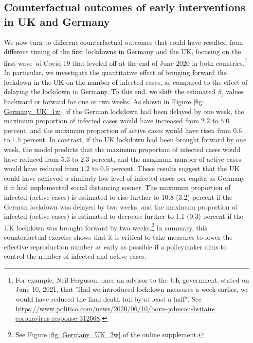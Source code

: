 \documentclass[12pt]{article}
\begin{document}
\subsection{Counterfactual outcomes of early interventions in UK and Germany}

We now turn to different counterfactual outcomes that could have resulted from
different timing of the first lockdowns in Germany and the UK, focusing on the
first wave\ of Covid-19 that leveled off at the end of June 2020 in both
countries.\footnote{For example, Neil Ferguson, once an advisor to the UK
government, stated on June 10, 2021, that "Had we introduced lockdown measures
a week earlier, we would have reduced the final death toll by at least a
half". See
\url{https://www.politico.com/news/2020/06/10/boris-johnson-britain-coronavirus-response-312668}.}
In particular, we investigate the quantitative effect of bringing forward the
lockdown in the UK on the number of infected cases, as compared to the effect
of delaying the lockdown in Germany. To this end, we shift the estimated
$\beta_{t}$ values backward or forward for one or two weeks. As shown in
Figure \ref{fig: Germany_UK_1w}, if the German lockdown had been delayed by
one week, the maximum proportion of infected cases would have increased from
$2.2$ to $5.0$ percent, and the maximum proportion of active cases would have
risen from $0.6$ to $1.5$ percent. In contrast, if the UK lockdown had been
brought forward by one week, the model predicts that the maximum proportion of
infected cases would have reduced from $5.3$ to $2.3$ percent, and the maximum
number of active cases would have reduced from $1.2$ to $0.5$ percent. These
results suggest that the UK could have achieved a similarly low level of
infected cases per capita as Germany if it had implemented social distancing
sooner. The maximum proportion of infected (active cases) is estimated to rise
further to $10.8$ ($3.2$) percent if the German lockdown was delayed by two
weeks, and the maximum proportion of infected (active cases) is estimated to
decrease further to $1.1$ ($0.3$) percent if the UK lockdown was brought
forward by two weeks.\footnote{See Figure \ref{fig: Germany_UK_2w} of the
online supplement.} In summary, this counterfactual exercise shows that it is
critical to take measures to lower the effective reproduction number as early
as possible if a policymaker aims to control the number of infected and active cases.%
\end{document}
